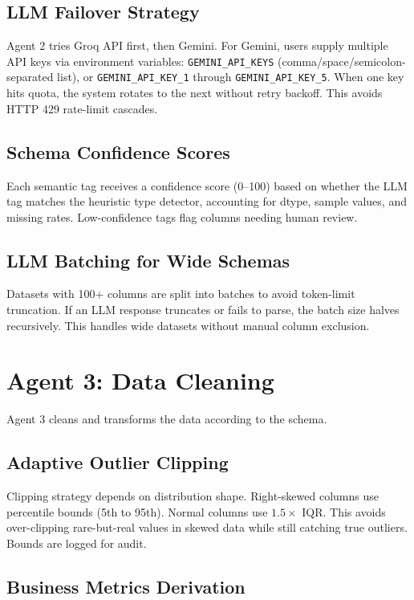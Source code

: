 \documentclass[12pt,a4paper,openany]{report}
\begin{document}
\subsection{LLM Failover Strategy}

Agent 2 tries Groq API first, then Gemini. For Gemini, users supply multiple API keys via environment variables: \texttt{GEMINI\_API\_KEYS} (comma/space/semicolon-separated list), or \texttt{GEMINI\_API\_KEY\_1} through \texttt{GEMINI\_API\_KEY\_5}. When one key hits quota, the system rotates to the next without retry backoff. This avoids HTTP 429 rate-limit cascades.

\subsection{Schema Confidence Scores}

Each semantic tag receives a confidence score (0--100) based on whether the LLM tag matches the heuristic type detector, accounting for dtype, sample values, and missing rates. Low-confidence tags flag columns needing human review.

\subsection{LLM Batching for Wide Schemas}

Datasets with 100+ columns are split into batches to avoid token-limit truncation. If an LLM response truncates or fails to parse, the batch size halves recursively. This handles wide datasets without manual column exclusion.

\section{Agent 3: Data Cleaning}

Agent 3 cleans and transforms the data according to the schema.

\subsection{Adaptive Outlier Clipping}

Clipping strategy depends on distribution shape. Right-skewed columns use percentile bounds (5th to 95th). Normal columns use $1.5\times$ IQR. This avoids over-clipping rare-but-real values in skewed data while still catching true outliers. Bounds are logged for audit.

\subsection{Business Metrics Derivation}
\end{document}
